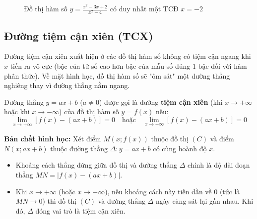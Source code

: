 \documentclass[12pt]{article}
\begin{document}
\begin{loigiai}
\begin{figure}[H]
			\caption{Đồ thị hàm số $y = \frac{x^2 - 3x + 2}{x^2 - 4}$ có duy nhất một TCĐ $x = -2$}
		\end{figure}
	\end{loigiai}
	
	\subsection{Đường tiệm cận xiên (TCX)}
	
	Đường tiệm cận xiên xuất hiện ở các đồ thị hàm số không có tiệm cận ngang khi $x$ tiến ra vô cực (bậc của tử số cao hơn bậc của mẫu số đúng $1$ bậc đối với hàm phân thức). Về mặt hình học, đồ thị hàm số sẽ "ôm sát" một đường thẳng nghiêng thay vì đường thẳng nằm ngang.
	
	\begin{phuongphap}
		Đường thẳng $y = ax + b$ ($a \ne 0$) được gọi là đường \textbf{tiệm cận xiên} (khi $x \to +\infty$ hoặc khi $x \to -\infty$) của đồ thị hàm số $y = f(x)$ nếu:
		\[ \lim_{x \to +\infty} [f(x) - (ax + b)] = 0 \quad \text{hoặc} \quad \lim_{x \to -\infty} [f(x) - (ax + b)] = 0 \]
	\end{phuongphap}
	
	\textbf{Bản chất hình học:} 
	Xét điểm $M(x; f(x))$ thuộc đồ thị $(C)$ và điểm $N(x; ax + b)$ thuộc đường thẳng $\Delta: y = ax + b$ có cùng hoành độ $x$. 
	\begin{itemize}
		\item Khoảng cách thẳng đứng giữa đồ thị và đường thẳng $\Delta$ chính là độ dài đoạn thẳng $MN = |f(x) - (ax + b)|$.
		\item Khi $x \to +\infty$ (hoặc $x \to -\infty$), nếu khoảng cách này tiến dần về $0$ (tức là $MN \to 0$) thì đồ thị $(C)$ và đường thẳng $\Delta$ ngày càng sát lại gần nhau. Khi đó, $\Delta$ đóng vai trò là tiệm cận xiên.
	\end{itemize}
	
\end{document}
